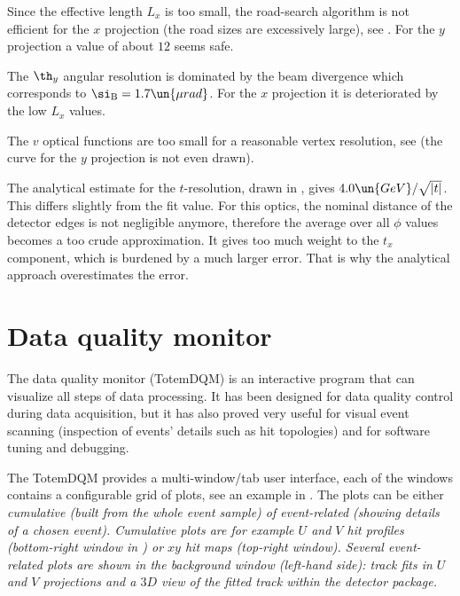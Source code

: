 Since the effective length $L_x$ is too small, the road-search algorithm is not efficient for the $x$ projection (the road sizes are excessively large), see . For the $y$ projection a value of about $12$ seems safe.

\bmfig
{}
\emfig

The $\th_y$ angular resolution is dominated by the beam divergence which corresponds to $\si_{\rm B} = 1.7\un{\mu rad}$. For the $x$ projection it is deteriorated by the low $L_x$ values.

The $v$ optical functions are too small for a reasonable vertex resolution, see  (the curve for the $y$ projection is not even drawn).

\bmfig
{}
\emfig

The analytical estimate  for the $t$-resolution, drawn in , gives $4.0\un{GeV}/\sqrt{|t|}$. This differs slightly from the fit value. For this optics, the nominal distance of the detector edges is not negligible anymore, therefore the average over all $\phi$ values becomes a too crude approximation. It gives too much weight to the $t_x$ component, which is burdened by a much larger error. That is why the analytical approach overestimates the error.




\section[dqm]{Data quality monitor}

The data quality monitor (TotemDQM) is an interactive program that can visualize all steps of data processing. It has been designed for data quality control during data acquisition, but it has also proved very useful for visual event scanning (inspection of events' details such as hit topologies) and for software tuning and debugging.

The TotemDQM provides a multi-window/tab user interface, each of the windows contains a configurable grid of plots, see an example in . The plots can be either \em{cumulative} (built from the whole event sample) of \em{event-related} (showing details of a chosen event). Cumulative plots are for example $U$ and $V$ hit profiles (bottom-right window in ) or $xy$ hit maps (top-right window). Several event-related plots are shown in the background window (left-hand side): track fits in $U$ and $V$ projections and a $3D$ view of the fitted track within the detector package.


